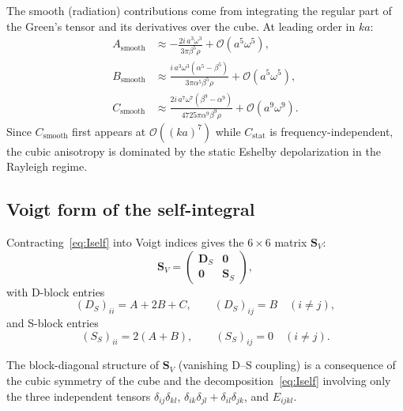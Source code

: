 \documentclass[11pt,a4paper]{article}
\newcommand{\order}[1]{\mathcal{O}\!\left(#1\right)}
\newcommand{\bS}{\mathbf{S}}
\begin{document}
The smooth (radiation) contributions come from integrating the
regular part of the Green's tensor and its derivatives over the cube.
At leading order in $ka$:
\begin{align}
  A_\text{smooth} &\approx
    -\frac{2i\,a^3\omega^3}{3\pi\beta^5\rho}
    + \order{a^5\omega^5},
  \label{eq:Asmooth} \\[6pt]
  B_\text{smooth} &\approx
    \frac{i\,a^3\omega^3(\alpha^5 - \beta^5)}
         {3\pi\alpha^5\beta^5\rho}
    + \order{a^5\omega^5},
  \label{eq:Bsmooth} \\[6pt]
  C_\text{smooth} &\approx
    \frac{2i\,a^7\omega^7(\beta^9 - \alpha^9)}
         {4725\pi\alpha^9\beta^9\rho}
    + \order{a^9\omega^9}.
  \label{eq:Csmooth}
\end{align}
Since $C_\text{smooth}$ first appears at $\order{(ka)^7}$ while
$C_\text{stat}$ is frequency-independent, the cubic anisotropy is
dominated by the static Eshelby depolarization in the Rayleigh
regime.

\subsection{Voigt form of the self-integral}

Contracting~\eqref{eq:Iself} into Voigt indices gives the
$6 \times 6$ matrix $\bS_V$:
\begin{equation}
  \bS_V = \begin{pmatrix}
    \mathbf{D}_S & \mathbf{0} \\
    \mathbf{0} & \mathbf{S}_S
  \end{pmatrix},
  \label{eq:SV}
\end{equation}
with D-block entries
\begin{equation}
  (D_S)_{ii} = A + 2B + C, \qquad
  (D_S)_{ij} = B \quad (i \neq j),
  \label{eq:DS}
\end{equation}
and S-block entries
\begin{equation}
  (S_S)_{ii} = 2(A + B), \qquad
  (S_S)_{ij} = 0 \quad (i \neq j).
  \label{eq:SS}
\end{equation}

The block-diagonal structure of $\bS_V$ (vanishing D--S coupling)
is a consequence of the cubic symmetry of the cube and the
decomposition~\eqref{eq:Iself} involving only the three independent
tensors $\delta_{ij}\delta_{kl}$,
$\delta_{ik}\delta_{jl} + \delta_{il}\delta_{jk}$, and $E_{ijkl}$.

\end{document}
